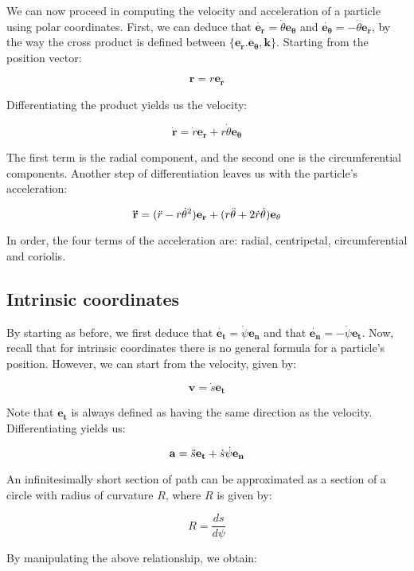 \documentclass[12pt]{article}
\begin{document}
We can now proceed in computing the velocity and acceleration of a particle using polar coordinates. First, we can deduce that $\mathbf{\dot{e_r}} = \dot{\theta}\mathbf{e_{\theta}}$ and $\mathbf{\dot{e_{\theta}}} = -\dot{\theta}\mathbf{e_r}$, by the way the cross product is defined between $\{\mathbf{e_r. e_{\theta}, k}\}$. Starting from the position vector:

\[ \mathbf{r} = r\mathbf{e_r} \]

Differentiating the product yields us the velocity:

\[ \mathbf{\dot{r}} = \dot{r}\mathbf{e_r} + r\dot{\theta}\mathbf{e_{\theta}} \]

The first term is the radial component, and the second one is the circumferential components. Another step of differentiation leaves us with the particle's acceleration:

\[ \mathbf{\Ddot{r}} = (\Ddot{r} - r\dot{\theta}^2)\mathbf{e_r} + (r\Ddot{\theta} + 2\dot{r}\dot{\theta})\mathbf{e_{\theta}} \]

In order, the four terms of the acceleration are: radial, centripetal, circumferential and coriolis.

\subsection{Intrinsic coordinates}

By starting as before, we first deduce that $\mathbf{\dot{e_t}} = \dot{\psi}\mathbf{e_n}$ and that $\mathbf{\dot{e_n}} = -\dot{\psi}\mathbf{e_t}$. Now, recall that for intrinsic coordinates there is no general formula for a particle's position. However, we can start from the velocity, given by:

\[ \mathbf{v} = \dot{s}\mathbf{e_t} \]

Note that $\mathbf{e_t}$ is always defined as having the same direction as the velocity. Differentiating yields us:

\[ \mathbf{a} = \Ddot{s}\mathbf{e_t} + \dot{s}\dot{\psi}\mathbf{e_n}  \]

\begin{definition}
    An infinitesimally short section of path can be approximated as a section of a circle with radius of curvature $R$, where $R$ is given by:

    \[ R = \frac{ds}{d\psi} \]
\end{definition}

By manipulating the above relationship, we obtain:
\end{document}
